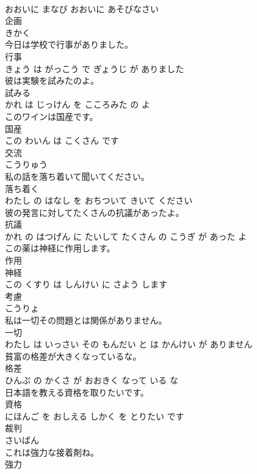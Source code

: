 \documentclass[8pt]{extreport}
\begin{document}
\begin{CJK}{UTF8}{min}
\\	おおいに まなび おおいに あそびなさい		
\\	企画	
\\	きかく		
\\	今日は学校で行事がありました。	
\\	行事 
\\	きょう は がっこう で ぎょうじ が ありました		
\\	彼は実験を試みたのよ。	
\\	試みる 
\\	かれ は じっけん を こころみた の よ		
\\	このワインは国産です。	
\\	国産 
\\	この わいん は こくさん です		
\\	交流	
\\	こうりゅう		
\\	私の話を落ち着いて聞いてください。	
\\	落ち着く 
\\	わたし の はなし を おちついて きいて ください		
\\	彼の発言に対してたくさんの抗議があったよ。	
\\	抗議 
\\	かれ の はつげん に たいして たくさん の こうぎ が あった よ		
\\	この薬は神経に作用します。	
\\	作用 
\\	神経 
\\	この くすり は しんけい に さよう します		
\\	考慮	
\\	こうりょ		
\\	私は一切その問題とは関係がありません。	
\\	一切 
\\	わたし は いっさい その もんだい と は かんけい が ありません		
\\	貧富の格差が大きくなっているな。	
\\	格差 
\\	ひんぷ の かくさ が おおきく なって いる な		
\\	日本語を教える資格を取りたいです。	
\\	資格 
\\	にほんご を おしえる しかく を とりたい です		
\\	裁判	
\\	さいばん		
\\	これは強力な接着剤ね。	
\\	強力 

\end{CJK}
\end{document}
